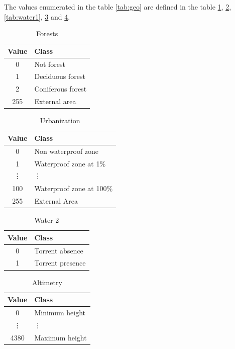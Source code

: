 \documentclass[Lau]{sapthesis} %
\begin{document}
The values enumerated in the table \ref{tab:geo} are defined in the table
\ref{tab:forest}, \ref{tab:urbanization}, \ref{tab:water1}, \ref{tab:water2} and
\ref{tab:altimetry}.

\begin{table}[ht]
\centering
\begin{tabular}{|c|l|}
\hline
\textbf{Value} & \textbf{Class}\\
\hline
0 & Not forest\\
1 & Deciduous forest\\
2 & Coniferous forest\\
255 & External area\\
\hline
\end{tabular}
\caption{Forests}
\label{tab:forest}
\end{table}
%
\begin{table}[ht]
\centering
\begin{tabular}{|c|l|}
\hline
\textbf{Value} & \textbf{Class}\\
\hline
0 & Non waterproof zone\\
1 & Waterproof zone at 1\%\\
\vdots & \vdots\\
100 & Waterproof zone at 100\%\\
255 & External Area\\
\hline
\end{tabular}
\caption{Urbanization}
\label{tab:urbanization}
\end{table}
%
\begin{table}[ht]
\centering
\begin{tabular}{|c|l|}
\hline
\textbf{Value} & \textbf{Class}\\
\hline
0 & Torrent absence\\
1 & Torrent presence\\
\hline
\end{tabular}
\caption{Water 2}
\label{tab:water2}
\end{table}
%
\begin{table}[ht]
\centering
\begin{tabular}{|c|l|}
\hline
\textbf{Value} & \textbf{Class}\\
\hline
0 & Minimum height\\
\vdots & \vdots\\
4380 & Maximum height\\
\hline
\end{tabular}
\caption{Altimetry}
\label{tab:altimetry}
\end{table}
\end{document}
